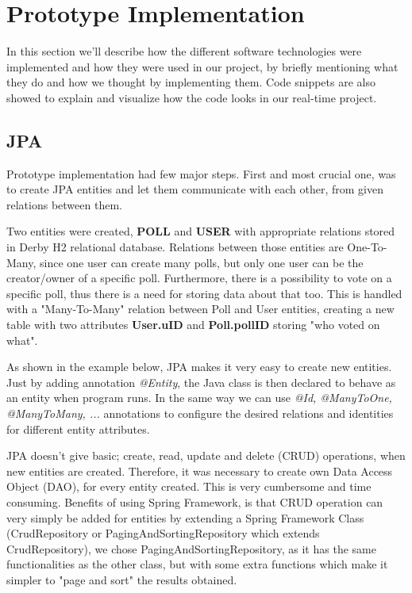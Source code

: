 \section{Prototype Implementation}
\label{sec:implementation}
In this section we'll describe how the different software technologies were implemented and how they were used in our project, by briefly mentioning what they do and how we thought by implementing them. Code snippets are also showed to explain and visualize how the code looks in our real-time project.

\subsection{JPA}\label{sub:jpa}
Prototype implementation had few major steps. First and most crucial one, was to create JPA entities and let them communicate with each other, from given relations between them.

Two entities were created, \textbf{POLL} and \textbf{USER} with appropriate relations stored in Derby H2 relational database. Relations between those entities are One-To-Many, since one user can create many polls, but only one user can be the creator/owner of a specific poll. Furthermore, there is a possibility to vote on a specific poll, thus there is a need for storing data about that too. This is handled with a "Many-To-Many" relation between Poll and User entities, creating a new table with two attributes \textbf{User.uID} and \textbf{Poll.pollID} storing "who voted on what".

As shown in the example below, JPA makes it very easy to create new entities. Just by adding annotation \textit{@Entity}, the Java class is then declared to behave as an entity when program runs. In the same way we can use \textit{@Id, @ManyToOne, @ManyToMany, ...} annotations to configure the desired relations and identities for different entity attributes.



JPA doesn't give basic; create, read, update and delete (CRUD) operations, when new entities are created. Therefore, it was necessary to create own Data Access Object (DAO), for every entity created. This is very cumbersome and time consuming. Benefits of using Spring Framework, is that CRUD operation can very simply be added for entities by extending a Spring Framework Class (CrudRepository or PagingAndSortingRepository which extends CrudRepository), we chose PagingAndSortingRepository, as it has the same functionalities as the other class, but with some extra functions which make it simpler to "page and sort" the results obtained.  

